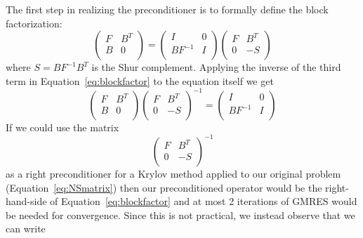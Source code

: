 \documentclass[acmtoms,acmnow]{acmtrans2m}
\begin{document}
The first step in realizing the preconditioner is to formally define
the block factorization:
\begin{equation}
\label{eq:blockfactor}
\left(\begin{array}{cc}
	F & B^T \\
	B & 0 \\
\end{array}\right)
=
\left(\begin{array}{cc}
	I & 0  \\
	BF^{-1} & I \\
\end{array}\right)
\left(\begin{array}{cc}
	F & B^T \\
	0 & -S \\
\end{array}\right)
\end{equation}
where $S = BF^{-1}B^T$ is the Shur complement.  Applying the inverse
of the third term in Equation~\ref{eq:blockfactor} to the equation
itself we get
\begin{equation}
\label{eq:blockfactor1}
\left(\begin{array}{cc}
	F & B^T \\
	B & 0 \\
\end{array}
\right)
\left(\begin{array}{cc}
	F & B^T \\
	0 & -S \\
\end{array}\right)^{-1}
=
\left(\begin{array}{cc}
	I & 0  \\
	BF^{-1} & I \\
\end{array}\right)
\end{equation}
If we could use the matrix
\begin{equation}
\label{eq:exactprecon}
\left(\begin{array}{cc}
	F & B^T \\
	0 & -S \\
\end{array}\right)^{-1}
\end{equation}
as a right preconditioner for a Krylov method applied to our 
original problem (Equation~\ref{eq:NSmatrix}) then our 
preconditioned operator would be the right-hand-side of
Equation~\ref{eq:blockfactor} and at most 2 iterations of GMRES would
be needed for convergence.  Since this is not practical, we instead
observe that we can write
\end{document}
